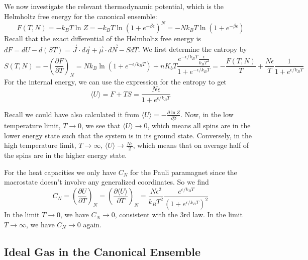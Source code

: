 \documentclass[12pt, a4paper, oneside, openright, titlepage]{book}
\begin{document}
We now investigate the relevant thermodynamic potential, which is the Helmholtz free energy for the canonical ensemble: \begin{equation*}
    F(T,N) = -k_BT\ln Z = -k_BT\ln (1+e^{-\beta \epsilon})^N = -Nk_BT\ln(1+e^{-\beta \epsilon})
\end{equation*}
Recall that the exact differential of the Helmholtz free energy is $dF = dU-d(ST) = \vec{J}\cdot d\vec{q} + \vec{\mu}\cdot d\vec{N}-SdT$. We first determine the entropy by \begin{equation*}
    S(T,N) = -\left(\frac{\partial F}{\partial T}\right)_N = Nk_B\ln(1+e^{-\epsilon/k_BT}) + nK_bT\frac{e^{-\epsilon/k_BT}\frac{\epsilon}{k_BT^2}}{1+e^{-\epsilon/k_BT}} = -\frac{F(T,N)}{T} + \frac{N\epsilon}{T}\frac{1}{1+e^{\epsilon/k_BT}}
\end{equation*}
For the internal energy, we can use the expression for the entropy to get \begin{equation*}
    \langle U \rangle = F + TS = \frac{N\epsilon}{1+e^{\epsilon/k_BT}}
\end{equation*}

Recall we could have also calculated it from $\langle U \rangle = -\frac{\partial \ln Z}{\partial \beta}$. Now, in the low temperature limit, $T\rightarrow 0$, we see that $\langle U\rangle \rightarrow 0$, which means all spins are in the lower energy state such that the system is in its ground state. Conversely, in the high temperature limit, $T\rightarrow \infty$, $\langle U \rangle \rightarrow \frac{N\epsilon}{2}$, which means that on average half of the spins are in the higher energy state.

For the heat capacities we only have $C_N$ for the Pauli paramagnet since the macrostate doesn't involve any generalized coordinates. So we find \begin{equation*}
    C_N = \left(\frac{\partial U}{\partial T}\right)_N = \left(\frac{\partial \langle U\rangle}{\partial T}\right)_N = \frac{N\epsilon^2}{k_BT^2}\frac{e^{\epsilon/k_BT}}{(1+e^{\epsilon/k_BT})^2}
\end{equation*}
In the limit $T\rightarrow 0$, we have $C_N\rightarrow 0$, consistent with the 3rd law. In the limit $T\rightarrow \infty$, we have $C_N\rightarrow 0$ again.


\subsection{Ideal Gas in the Canonical Ensemble}
\end{document}

